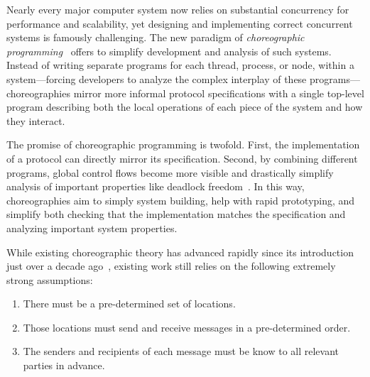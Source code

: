 Nearly every major computer system now relies on substantial concurrency for performance and scalability,
yet designing and implementing correct concurrent systems is famously challenging.
The new paradigm of \emph{choreographic programming}~\citep{Montesi13,Montesi23} offers to simplify development and analysis of such systems.
Instead of writing separate programs for each thread, process, or node, within a system---forcing developers to analyze the complex interplay of these programs---%
choreographies mirror more informal protocol specifications with a single top-level program
describing both the local operations of each piece of the system and how they interact.

The promise of choreographic programming is twofold.
First, the implementation of a protocol can directly mirror its specification.
Second, by combining different programs, global control flows become more visible
and drastically simplify analysis of important properties like deadlock freedom~\citep{CarboneM13}.
In this way, choreographies aim to simply system building, help with rapid prototyping,
and simplify both checking that the implementation matches the specification
and analyzing important system properties.


While existing choreographic theory has advanced rapidly since its introduction just over a decade ago~\citep{CarboneM13,HirschG22,CruzFilipeGLMP22,CruzFilipeGLMP23,BatesK+25,SamuelsonHC25},
existing work still relies on the following extremely strong assumptions:
\begin{enumerate}
  \item\label{li:assume:static-locs}
    There must be a pre-determined set of locations.
  \item\label{li:assume:known-order}
    Those locations must send and receive messages in a pre-determined order.
  \item\label{li:assume:known-endpoints}
    The senders and recipients of each message must be know to all relevant parties in advance.
\end{enumerate}

